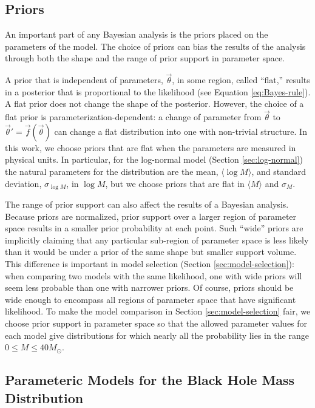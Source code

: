 \documentclass[preprint]{aastex}
\newcommand{\Msun}{M_\odot}
\newcommand{\vtheta}{\vec{\theta}}
\begin{document}
\subsection{Priors}

An important part of any Bayesian analysis is the priors placed on the
parameters of the model.  The choice of priors can bias the results of
the analysis through both the shape and the range of prior support in
parameter space.

A prior that is independent of parameters, $\vtheta$, in some region,
called ``flat,'' results in a posterior that is proportional to the
likelihood (see Equation \eqref{eq:Bayes-rule}).  A flat prior does
not change the shape of the posterior.  However, the choice of a flat
prior is parameterization-dependent: a change of parameter from
$\vtheta$ to $\vtheta' = \vec{f}(\vtheta)$ can change a flat
distribution into one with non-trivial structure.  In this work, we
choose priors that are flat when the parameters are measured in
physical units.  In particular, for the log-normal model (Section
\ref{sec:log-normal}) the natural parameters for the distribution are
the mean, $\langle \log M \rangle$, and standard deviation,
$\sigma_{\log M}$, in $\log M$, but we choose priors that are flat in
$\langle M \rangle$ and $\sigma_M$.

The range of prior support can also affect the results of a Bayesian
analysis.  Because priors are normalized, prior support over a larger
region of parameter space results in a smaller prior probability at
each point.  Such ``wide'' priors are implicitly claiming that any
particular sub-region of parameter space is less likely than it would
be under a prior of the same shape but smaller support volume.  This
difference is important in model selection (Section
\ref{sec:model-selection}): when comparing two models with the same
likelihood, one with wide priors will seem less probable than one with
narrower priors.  Of course, priors should be wide enough to encompass
all regions of parameter space that have significant likelihood.  To
make the model comparison in Section \ref{sec:model-selection} fair,
we choose prior support in parameter space so that the allowed
parameter values for each model give distributions for which nearly
all the probability lies in the range $0 \leq M \leq 40 \Msun$.

\subsection{Parameteric Models for the Black Hole Mass Distribution}
\label{subsec:parameteric-models}
\end{document}
